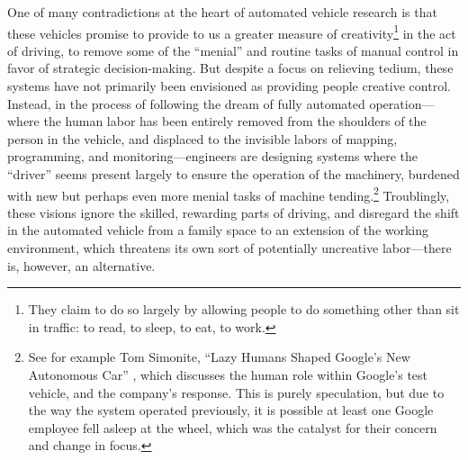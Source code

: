 One of many contradictions at the heart of
automated vehicle research is that these vehicles promise
to provide to us a greater measure of creativity\footnote{They claim
  to do so largely by allowing people to do something other than sit
  in traffic: to read, to sleep, to eat, to work.} in the act of
driving, to remove some of the ``menial'' and routine tasks of manual
control in favor of strategic decision-making. But
despite a focus on relieving tedium, these systems
have not primarily been envisioned as providing people creative
control. Instead, in the process of following 
the dream of fully automated operation---where the human labor has been
entirely removed from the shoulders of the person in the vehicle, and
displaced to the invisible labors of mapping, programming, and
monitoring---engineers are designing systems where the ``driver''
seems present largely to ensure the operation of the
machinery, burdened with new but perhaps even more menial tasks of
machine tending.\footnote{See for example Tom Simonite, ``Lazy Humans
Shaped Google's New Autonomous Car'' \cite{simonite}, which discusses
the human role within Google's test vehicle,
and the company's response. This is purely speculation, but due to
the way the system operated previously, it is possible at least one Google
employee fell asleep at the wheel, which was the catalyst for their
concern and change in focus.} Troublingly, these visions ignore the
skilled, rewarding parts of driving, and disregard the shift in the automated
  vehicle from a family space to an extension of the working environment,
  which threatens its own sort of potentially uncreative labor---there
  is, however, an alternative.

